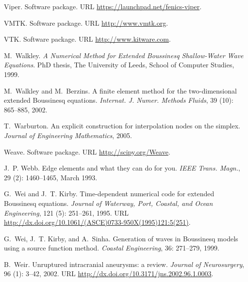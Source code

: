 \begin{thebibliography}{467}
Viper.
\newblock Software package.
\newblock URL \url{https://launchpad.net/fenics-viper}.

VMTK.
\newblock Software package.
\newblock URL \url{http://www.vmtk.org}.

VTK.
\newblock Software package.
\newblock URL \url{http://www.kitware.com}.

M.~Walkley.
\newblock \emph{A Numerical Method for Extended {B}oussinesq Shallow-Water Wave
  Equations}.
\newblock PhD thesis, The University of Leeds, School of Computer Studies,
  1999.

M.~Walkley and M.~Berzins.
\newblock A finite element method for the two-dimensional extended {B}oussinesq
  equations.
\newblock \emph{Internat. J. Numer. Methods Fluids}, 39 (10):
  865--885, 2002.

T.~Warburton.
\newblock An explicit construction for interpolation nodes on the simplex.
\newblock \emph{Journal of Engineering Mathematics}, 2005.

Weave.
\newblock Software package.
\newblock URL \url{http://scipy.org/Weave}.

J.~P. Webb.
\newblock Edge elements and what they can do for you.
\newblock \emph{IEEE Trans. Magn.}, 29 (2): 1460--1465, March
  1993.

G.~Wei and J.~T. Kirby.
\newblock Time-dependent numerical code for extended {B}oussinesq equations.
\newblock \emph{Journal of Waterway, Port, Coastal, and Ocean Engineering},
  121 (5): 251--261, 1995.
\newblock URL \url{http://dx.doi.org/10.1061/(ASCE)0733-950X(1995)121:5(251)}.

G.~Wei, J.~T. Kirby, and A.~Sinha.
\newblock Generation of waves in {B}oussinesq models using a source function
  method.
\newblock \emph{Coastal Engineering}, 36: 271--279, 1999.

B.~Weir.
\newblock Unruptured intracranial aneurysms: a review.
\newblock \emph{Journal of Neurosurgery}, 96 (1): 3--42,
  2002.
\newblock URL \url{http://dx.doi.org/10.3171/jns.2002.96.1.0003}.


\end{thebibliography}
